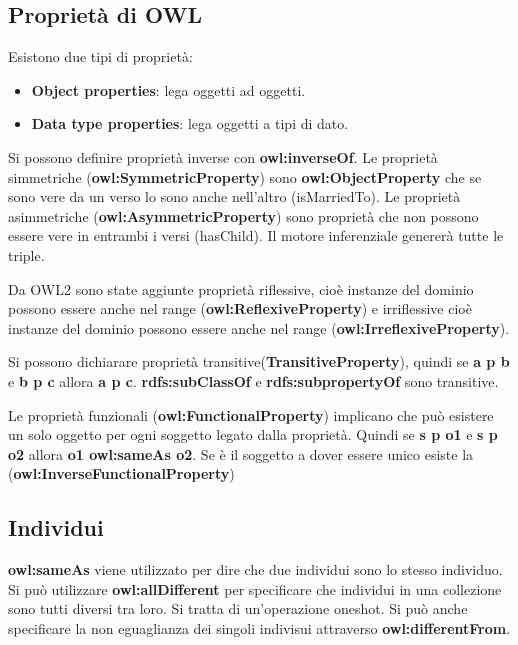 \subsection{Proprietà di OWL}
Esistono due tipi di proprietà:
\begin{itemize}
	\item \textbf{Object properties}: lega oggetti ad oggetti.
	\item \textbf{Data type properties}: lega oggetti a tipi di dato.
\end{itemize}
Si possono definire proprietà inverse con \textbf{owl:inverseOf}. Le proprietà simmetriche (\textbf{owl:SymmetricProperty}) sono \textbf{owl:ObjectProperty} che se sono vere da un verso lo sono anche nell'altro (isMarriedTo). Le proprietà asimmetriche (\textbf{owl:AsymmetricProperty}) sono proprietà che non possono essere vere in entrambi i versi (hasChild). Il motore inferenziale genererà tutte le triple.

\noindent Da OWL2 sono state aggiunte proprietà riflessive, cioè instanze del dominio possono essere anche nel range (\textbf{owl:ReflexiveProperty}) e irriflessive cioè instanze del dominio possono essere anche nel range (\textbf{owl:IrreflexiveProperty}).

\noindent Si possono dichiarare proprietà transitive(\textbf{TransitiveProperty}), quindi se \textbf{a p b} e \textbf{b p c} allora \textbf{a p c}. \textbf{rdfs:subClassOf} e \textbf{rdfs:subpropertyOf} sono transitive.

\noindent Le proprietà funzionali (\textbf{owl:FunctionalProperty}) implicano che può esistere un solo oggetto per ogni soggetto legato dalla proprietà. Quindi se \textbf{s p o1} e \textbf{s p o2} allora \textbf{o1 owl:sameAs o2}. Se è il soggetto a dover essere unico esiste la (\textbf{owl:InverseFunctionalProperty})

\subsection{Individui}
\textbf{owl:sameAs} viene utilizzato per dire che due individui sono lo stesso individuo. Si può utilizzare \textbf{owl:allDifferent} per specificare che individui in una collezione sono tutti diversi tra loro. Si tratta di un'operazione oneshot. Si può anche specificare la non eguaglianza dei singoli indivisui attraverso \textbf{owl:differentFrom}.

